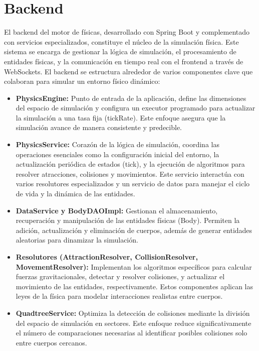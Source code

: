 \section{Backend}
El backend del motor de físicas, desarrollado con Spring Boot y complementado con servicios especializados, constituye el núcleo de la simulación física. Este sistema se encarga de gestionar la lógica de simulación, el procesamiento de entidades físicas, y la comunicación en tiempo real con el frontend a través de WebSockets.
El backend se estructura alrededor de varios componentes clave que colaboran para simular un entorno físico dinámico:
\begin{itemize}
    \item \textbf{PhysicsEngine:} Punto de entrada de la aplicación, define las dimensiones del espacio de simulación y configura un executor programado para actualizar la simulación a una tasa fija (tickRate). Este enfoque asegura que la simulación avance de manera consistente y predecible.
    \item \textbf{PhysicsService:} Corazón de la lógica de simulación, coordina las operaciones esenciales como la configuración inicial del entorno, la actualización periódica de estados (tick), y la ejecución de algoritmos para resolver atracciones, colisiones y movimientos. Este servicio interactúa con varios resolutores especializados y un servicio de datos para manejar el ciclo de vida y la dinámica de las entidades.
    \item \textbf{DataService y BodyDAOImpl:} Gestionan el almacenamiento, recuperación y manipulación de las entidades físicas (Body). Permiten la adición, actualización y eliminación de cuerpos, además de generar entidades aleatorias para dinamizar la simulación.
    \item \textbf{Resolutores (AttractionResolver, CollisionResolver, MovementResolver):} Implementan los algoritmos específicos para calcular fuerzas gravitacionales, detectar y resolver colisiones, y actualizar el movimiento de las entidades, respectivamente. Estos componentes aplican las leyes de la física para modelar interacciones realistas entre cuerpos.
    \item \textbf{QuadtreeService:}  Optimiza la detección de colisiones mediante la división del espacio de simulación en sectores. Este enfoque reduce significativamente el número de comparaciones necesarias al identificar posibles colisiones solo entre cuerpos cercanos.
\end{itemize}
